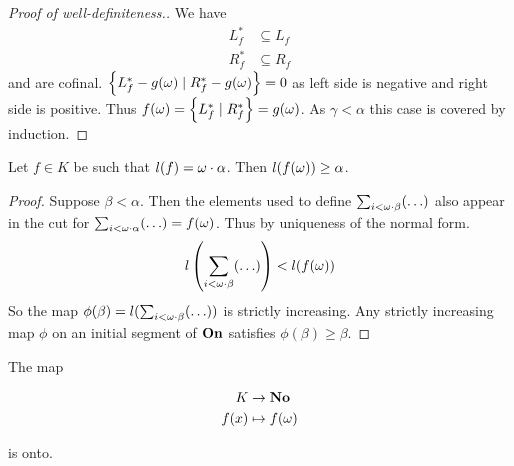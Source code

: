 \begin{proof}[Proof of well-definiteness.]
	We have
	\begin{align*}
		L_f^* &\subseteq L_f \\
		R_f^* &\subseteq R_f
	\end{align*}
	and are cofinal. $\left\{ L_f^* - g(\omega) \mid R_f^* - g(\omega) \right\} = 0$ as left side is negative and right side is positive.
	Thus $f(\omega) = \left\{ L_f^* \mid R_f^* \right\} = g(\omega)$. As $\gamma < \alpha$ this case is covered by induction.
	\end{proof}


	\begin{lemma} \label{6.1} %
		Let $f \in K$ be such that $l(f) = \omega \cdot \alpha$. Then $l(f(\omega)) \geq \alpha$.
	 \end{lemma}

	\begin{proof} %
	Suppose $\beta < \alpha$. Then the elements used to define $\sum_{i < \omega\cdot\beta} (\ldots)$ also appear in the cut for $\sum_{i < \omega\cdot\alpha} (\ldots) = f(\omega)$. Thus by uniqueness of the normal form.
	\begin{align*}
		l\left( \sum_{i < \omega\cdot\beta} (\ldots) \right) < l(f(\omega))
	\end{align*}
	So the map $\phi(\beta) = l(\sum_{i < \omega\cdot\beta} (\ldots))$ is strictly increasing.
	Any strictly increasing map $\phi$ on an initial segment of $\mathbf{On}$ satisfies $\phi(\beta) \geq \beta$.
\end{proof}

\begin{lemma} %
The map

\begin{align*}
	K &\rightarrow \mathbf{No} \\
	f(x) &\mapsto f(\omega)
\end{align*}

is onto.
 \end{lemma}

